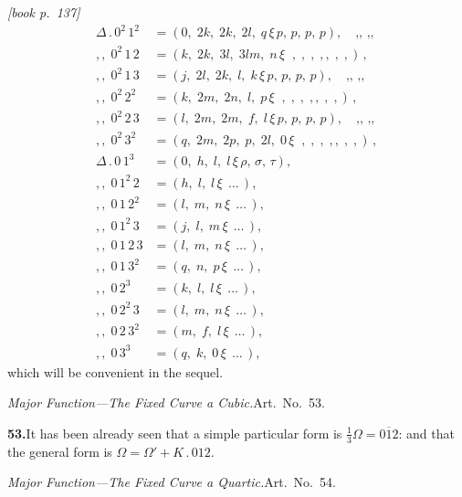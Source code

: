\documentclass[11pt,a4paper]{article}
\theoremstyle{plain}
\theoremstyle{definition}
\theoremstyle{remark}
\providecommand{\bdet}[1]{\overline{#1}}
\begin{document}
\medskip\noindent\textit{[book p.~137]}\quad
\begin{align*}
\Delta\,.\,0^2\,1^2 &= (0,\;2k,\;2k,\;2l,\;q\!\,\xi\,p,\,p,\,p,\,p),\quad \text{,, ,, }\\
,,\;0^2\,1\,2 &= (k,\;2k,\;3l,\;3lm,\;n\!\,\xi\;\;,\;,\;,\;,,\;,\;,)\,,\\
,,\;0^2\,1\,3 &= (j,\;2l,\;2k,\;l,\;k\!\,\xi\,p,\,p,\,p,\,p),\quad \text{,, ,, }\\
,,\;0^2\,2^2 &= (k,\;2m,\;2n,\;l,\;p\!\,\xi\;\;,\;,\;,\;,,\;,\;,)\,,\\
,,\;0^2\,2\,3 &= (l,\;2m,\;2m,\;f,\;l\!\,\xi\,p,\,p,\,p,\,p),\quad \text{,, ,, }\\
,,\;0^2\,3^2 &= (q,\;2m,\;2p,\;p,\;2l,\;0\!\,\xi\;\;,\;,\;,\;,,\;,\;,)\,,\\
\Delta\,.\,0\,1^3 &= (0,\;h,\;l,\;l\!\,\xi\,\rho,\,\sigma,\,\tau),\\
,,\;0\,1^2\,2 &= (h,\;l,\;l\!\,\xi\;\,\ldots\,),\\
,,\;0\,1\,2^2 &= (l,\;m,\;n\!\,\xi\;\,\ldots\,),\\
,,\;0\,1^2\,3 &= (j,\;l,\;m\!\,\xi\;\,\ldots\,),\\
,,\;0\,1\,2\,3 &= (l,\;m,\;n\!\,\xi\;\,\ldots\,),\\
,,\;0\,1\,3^2 &= (q,\;n,\;p\!\,\xi\;\,\ldots\,),\\
,,\;0\,2^3 &= (k,\;l,\;l\!\,\xi\;\,\ldots\,),\\
,,\;0\,2^2\,3 &= (l,\;m,\;n\!\,\xi\;\,\ldots\,),\\
,,\;0\,2\,3^2 &= (m,\;f,\;l\!\,\xi\;\,\ldots\,),\\
,,\;0\,3^3 &= (q,\;k,\;0\!\,\xi\;\,\ldots\,),
\end{align*}
which will be convenient in the sequel.

\medskip\noindent\textit{Major Function---The Fixed Curve a Cubic.}\quad Art.\ No.\ 53.

\medskip\noindent\textbf{53.}\quad It has been already seen that a simple particular form is $\tfrac{1}{3}\Omega = \bdet{012}$: and that the general form is $\Omega = \Omega' + K\,.\,012$.

\medskip\noindent\textit{Major Function---The Fixed Curve a Quartic.}\quad Art.\ No.\ 54.
\end{document}

